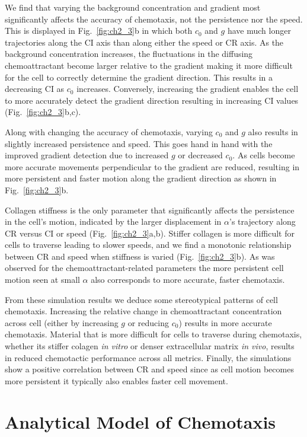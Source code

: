 We find that varying the background concentration and gradient most significantly affects the accuracy of chemotaxis, not the persistence nor the speed. This is displayed in Fig.\ \ref{fig:ch2_3}b in which both $c_0$ and $g$ have much longer trajectories along the CI axis than along either the speed or CR axis.
As the background concentration increases, the fluctuations in the diffusing chemoattractant become larger relative to the gradient making it more difficult for the cell to correctly determine the gradient direction. This results in a decreasing CI as $c_0$ increases. Conversely, increasing the gradient enables the cell to more accurately detect the gradient direction resulting in increasing CI values (Fig.\ \ref{fig:ch2_3}b,c).

Along with changing the accuracy of chemotaxis, varying $c_0$ and $g$ also results in slightly increased persistence and speed. This goes hand in hand with the improved gradient detection due to increased $g$ or decreased $c_0$. As cells become more accurate movements perpendicular to the gradient are reduced, resulting in more persistent and faster motion along the gradient direction as shown in Fig.\ \ref{fig:ch2_3}b.

Collagen stiffness is the only parameter that significantly affects the persistence in the cell's motion, indicated by the larger displacement in $\alpha$'s trajectory along CR versus CI or speed (Fig.\ \ref{fig:ch2_3}a,b). Stiffer collagen is more difficult for cells to traverse leading to slower speeds, and we find a monotonic relationship between CR and speed when stiffness is varied (Fig.\ \ref{fig:ch2_3}b). As was observed for the chemoattractant-related parameters the more persistent cell motion seen at small $\alpha$ also corresponds to more accurate, faster chemotaxis.

From these simulation results we deduce some stereotypical patterns of cell chemotaxis. Increasing the relative change in chemoattractant concentration across cell (either by increasing $g$ or reducing $c_0$) results in more accurate chemotaxis. Material that is more difficult for cells to traverse during chemotaxis, whether its stiffer colagen \textit{in vitro} or denser extracellular matrix \textit{in vivo}, results in reduced chemotactic performance across all metrics. Finally, the simulations show a positive correlation between CR and speed since as cell motion becomes more persistent it typically also enables faster cell movement.

\section{Analytical Model of Chemotaxis}

